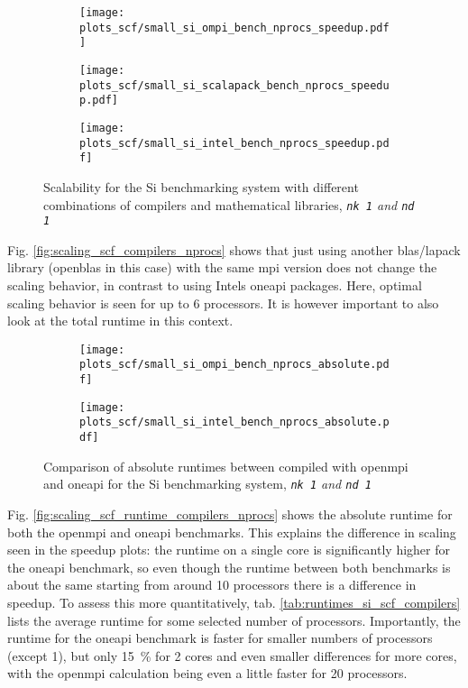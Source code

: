 \documentclass[main.tex]{subfiles}
\begin{document}
\begin{figure}[ht!]
\begin{subfigure}[b]{0.49\textwidth}
    \centering
    \texttt{[image: plots\_scf/small\_si\_ompi\_bench\_nprocs\_speedup.pdf]}
\end{subfigure}
\begin{subfigure}[b]{0.49\textwidth}
    \centering
    \texttt{[image: plots\_scf/small\_si\_scalapack\_bench\_nprocs\_speedup.pdf]}
\end{subfigure}
\begin{subfigure}[b]{0.49\textwidth}
    \centering
    \texttt{[image: plots\_scf/small\_si\_intel\_bench\_nprocs\_speedup.pdf]}
\end{subfigure}
\caption{Scalability for the Si benchmarking system with different combinations of compilers and mathematical libraries, \emph{\texttt{nk 1} and \texttt{nd 1}}}
\label{fig:scaling_scf_compilers_si}
\end{figure}

Fig. \ref{fig:scaling_scf_compilers_nprocs} shows that just using another \gls{blas}/\gls{lapack} library (\gls{openblas} in this case) with the same \gls{mpi} version does not change the scaling behavior, in contrast to using Intels \gls{oneapi} packages.
Here, optimal scaling behavior is seen for up to 6 processors.
It is however important to also look at the total runtime in this context.

\begin{figure}[ht!]
\begin{subfigure}[b]{0.49\textwidth}
    \centering
    \texttt{[image: plots\_scf/small\_si\_ompi\_bench\_nprocs\_absolute.pdf]}
\end{subfigure}
\begin{subfigure}[b]{0.49\textwidth}
    \centering
    \texttt{[image: plots\_scf/small\_si\_intel\_bench\_nprocs\_absolute.pdf]}
\end{subfigure}
\caption{Comparison of absolute runtimes between \QE compiled with \gls{openmpi} and \gls{oneapi} for the Si benchmarking system, \emph{\texttt{nk 1} and \texttt{nd 1}}}
\label{fig:scaling_scf_compilers_runtime_si}
\end{figure}
Fig. \ref{fig:scaling_scf_runtime_compilers_nprocs} shows the absolute runtime for both the \gls{openmpi} and \gls{oneapi} benchmarks.
This explains the difference in scaling seen in the speedup plots: the runtime on a single core is significantly higher for the \gls{oneapi} benchmark, so even though the runtime between both benchmarks is about the same starting from around 10 processors there is a difference in speedup.
To assess this more quantitatively, tab. \ref{tab:runtimes_si_scf_compilers} lists the average runtime for some selected number of processors.
Importantly, the runtime for the \gls{oneapi} benchmark is faster for smaller numbers of processors (except 1), but only \SI{15}{\percent} for 2 cores and even smaller differences for more cores, with the \gls{openmpi} calculation being even a little faster for 20 processors.
\end{document}
